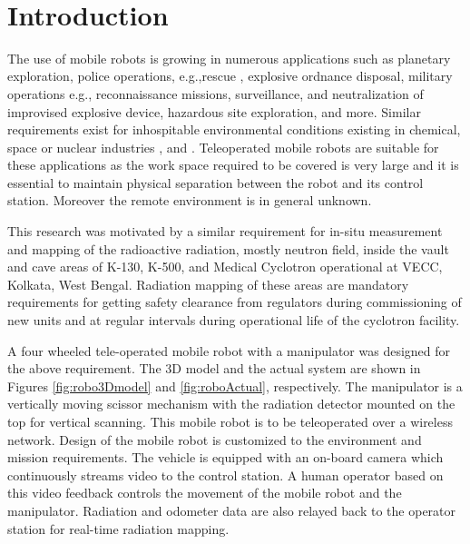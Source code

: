 \documentclass[12pt,a4paper, notitlepage]{article}
\begin{document}
	\begin{singlespace}
		
	\end{singlespace}
	~\\
	\newpage
	\section{Introduction}
	The use of mobile robots is growing in numerous	applications such as planetary exploration, police operations, e.g.,rescue \cite{guarnieri2004development},	explosive ordnance disposal, military operations \cite{pal2007mobile} e.g., reconnaissance	missions, surveillance, and neutralization of improvised explosive device, hazardous site exploration, and more. Similar requirements exist for inhospitable environmental conditions existing in chemical, space \cite{sheridan} or nuclear industries \cite{briones1994wall},\cite{kim20173d} and \cite{ohno2011robotic}.   Teleoperated mobile robots   are suitable for these applications  as the work space required to be covered is very large and it is essential to maintain  physical separation between the robot and its control station. Moreover the remote environment is in general unknown.
	
	 This research  was motivated by a similar requirement for in-situ measurement and mapping  of the radioactive radiation, mostly neutron field, inside the vault and cave areas of   K-130,  K-500,  and Medical Cyclotron operational at VECC, Kolkata, West Bengal.  Radiation mapping of these areas are  mandatory requirements for getting safety clearance from regulators during  commissioning of new units and at regular intervals during operational life of the cyclotron facility. 
	 
	 A four wheeled tele-operated mobile robot with a manipulator was designed for the above requirement. The 3D model and the actual system are shown in Figures \ref{fig:robo3Dmodel} and \ref{fig:roboActual}, respectively. The manipulator is a vertically moving scissor mechanism with the radiation detector mounted on the top for vertical scanning. This  mobile robot is to be teleoperated over a wireless network. Design of the mobile robot  is customized to the environment and mission requirements. The vehicle is equipped with an on-board camera which continuously streams video to the control station. A human operator based on  this video feedback controls the movement of the mobile robot and the manipulator. Radiation  and odometer data are also relayed back to the operator station for real-time radiation mapping. 
	 
\end{document}
